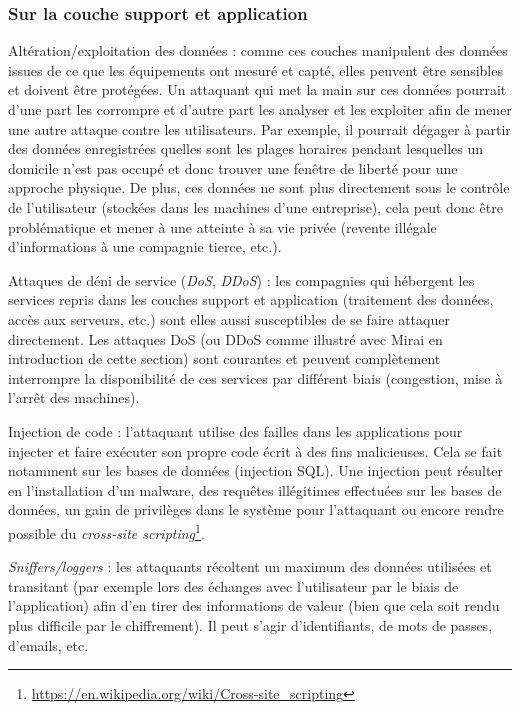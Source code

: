 \documentclass[]{article}
\begin{document}
\subsubsection{Sur la couche support et application}

\par Altération/exploitation des données : comme ces couches manipulent des données issues de ce que les équipements ont mesuré et capté, elles peuvent être sensibles et doivent être protégées. Un attaquant qui met la main sur ces données pourrait d'une part les corrompre et d'autre part les analyser et les exploiter afin de mener une autre attaque contre les utilisateurs. Par exemple, il pourrait dégager à partir des données enregistrées quelles sont les plages horaires pendant lesquelles un domicile n'est pas occupé et donc trouver une fenêtre de liberté pour une approche physique. De plus,  ces données ne sont plus directement sous le contrôle de l'utilisateur (stockées dans les machines d'une entreprise), cela peut donc être problématique et mener à une atteinte à sa vie privée (revente  illégale d'informations à une compagnie tierce, etc.).\\

\par Attaques de déni de service (\textit{DoS}, \textit{DDoS}) : les compagnies qui hébergent les services repris dans les couches support et application (traitement des données, accès aux serveurs, etc.) sont elles aussi susceptibles de se faire attaquer directement. Les attaques DoS (ou DDoS comme illustré avec Mirai en introduction de cette section) sont courantes et peuvent complètement interrompre la disponibilité de ces services par différent biais (congestion, mise à l'arrêt des machines).\\

\par Injection de code : l'attaquant utilise des failles dans les applications pour injecter et faire exécuter son propre code écrit à des fins malicieuses. Cela se fait notamment sur les bases de données (injection SQL). Une injection peut résulter en l'installation d'un malware, des requêtes illégitimes effectuées sur les bases de données, un gain de privilèges dans le système pour l'attaquant ou encore rendre possible du \textit{cross-site scripting}\footnote{\url{https://en.wikipedia.org/wiki/Cross-site_scripting}}.\\

\par \textit{Sniffers/loggers} : les attaquants récoltent un maximum des données utilisées et transitant (par exemple lors des échanges avec l'utilisateur par le biais de l'application) afin d'en tirer des informations de valeur (bien que cela soit rendu plus difficile par le chiffrement). Il peut s'agir d'identifiants, de mots de passes, d'emails, etc.\\
\end{document}
